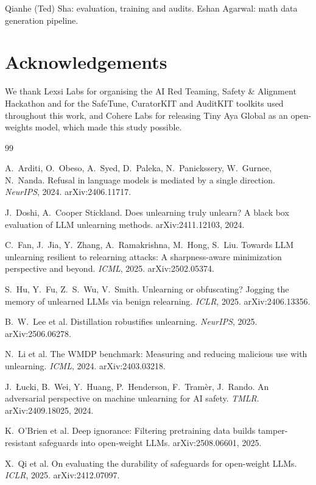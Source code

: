 \documentclass[10pt,twocolumn,letterpaper]{article}
\begin{document}
Qianhe (Ted) Sha: evaluation, training and audits. Eshan Agarwal: math data generation pipeline.

\section*{Acknowledgements}

We thank Lexsi Labs for organising the AI Red Teaming, Safety \& Alignment Hackathon and for the SafeTune, CuratorKIT and
AuditKIT toolkits used throughout this work, and Cohere Labs for releasing Tiny Aya Global as an open-weights model,
which made this study possible.

\begin{thebibliography}{99}\small
\setlength{\itemsep}{2pt}

A.~Arditi, O.~Obeso, A.~Syed, D.~Paleka, N.~Panickssery, W.~Gurnee, N.~Nanda.
Refusal in language models is mediated by a single direction. \emph{NeurIPS}, 2024. arXiv:2406.11717.

J.~Doshi, A.~Cooper Stickland.
Does unlearning truly unlearn? A black box evaluation of LLM unlearning methods. arXiv:2411.12103, 2024.

C.~Fan, J.~Jia, Y.~Zhang, A.~Ramakrishna, M.~Hong, S.~Liu.
Towards LLM unlearning resilient to relearning attacks: A sharpness-aware minimization perspective and beyond.
\emph{ICML}, 2025. arXiv:2502.05374.

S.~Hu, Y.~Fu, Z.~S.~Wu, V.~Smith.
Unlearning or obfuscating? Jogging the memory of unlearned LLMs via benign relearning. \emph{ICLR}, 2025.
arXiv:2406.13356.

B.~W.~Lee et al.
Distillation robustifies unlearning. \emph{NeurIPS}, 2025. arXiv:2506.06278.

N.~Li et al.
The WMDP benchmark: Measuring and reducing malicious use with unlearning. \emph{ICML}, 2024. arXiv:2403.03218.

J.~\L{}ucki, B.~Wei, Y.~Huang, P.~Henderson, F.~Tram\`er, J.~Rando.
An adversarial perspective on machine unlearning for AI safety. \emph{TMLR}. arXiv:2409.18025, 2024.

K.~O'Brien et al.
Deep ignorance: Filtering pretraining data builds tamper-resistant safeguards into open-weight LLMs.
arXiv:2508.06601, 2025.

X.~Qi et al.
On evaluating the durability of safeguards for open-weight LLMs. \emph{ICLR}, 2025. arXiv:2412.07097.


\end{thebibliography}
\end{document}

